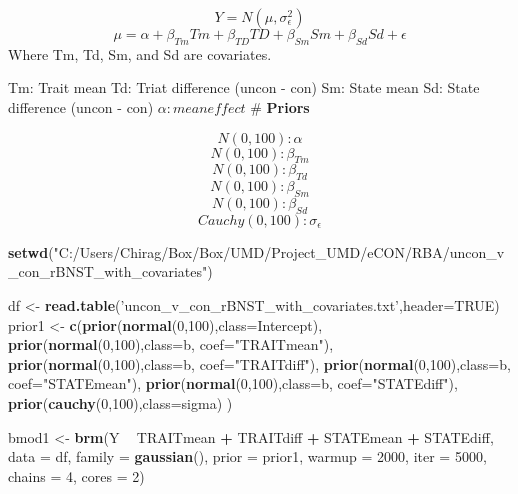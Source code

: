 \documentclass[
]{article}
\newenvironment{Shaded}{\begin{snugshade}}{\end{snugshade}}
\newcommand{\DataTypeTok}[1]{\textcolor[rgb]{0.13,0.29,0.53}{#1}}
\newcommand{\DecValTok}[1]{\textcolor[rgb]{0.00,0.00,0.81}{#1}}
\newcommand{\KeywordTok}[1]{\textcolor[rgb]{0.13,0.29,0.53}{\textbf{#1}}}
\newcommand{\NormalTok}[1]{#1}
\newcommand{\OperatorTok}[1]{\textcolor[rgb]{0.81,0.36,0.00}{\textbf{#1}}}
\newcommand{\OtherTok}[1]{\textcolor[rgb]{0.56,0.35,0.01}{#1}}
\newcommand{\StringTok}[1]{\textcolor[rgb]{0.31,0.60,0.02}{#1}}
\begin{document}
\[Y = N(\mu, \sigma_{\epsilon}^{2})\]
\[\mu = \alpha + \beta_{Tm}Tm + \beta_{TD}TD + \beta_{Sm}Sm+\beta_{Sd}Sd + \epsilon\]
Where Tm, Td, Sm, and Sd are covariates.

Tm: Trait mean Td: Triat difference (uncon - con) Sm: State mean Sd:
State difference (uncon - con) \(\alpha: mean effect\) \#
\textbf{Priors}

\[N(0,100): \alpha\] \[N(0,100): \beta_{Tm}\] \[N(0,100): \beta_{Td}\]
\[N(0,100): \beta_{Sm}\] \[N(0,100): \beta_{Sd}\]
\[Cauchy(0,100): \sigma_{\epsilon}\]

\begin{Shaded}
\begin{Highlighting}[]
\KeywordTok{setwd}\NormalTok{(}\StringTok{"C:/Users/Chirag/Box/Box/UMD/Project_UMD/eCON/RBA/uncon_v_con_rBNST_with_covariates"}\NormalTok{)}

\NormalTok{df <-}\StringTok{ }\KeywordTok{read.table}\NormalTok{(}\StringTok{'uncon_v_con_rBNST_with_covariates.txt'}\NormalTok{,}\DataTypeTok{header=}\OtherTok{TRUE}\NormalTok{)}
\NormalTok{prior1 <-}\StringTok{ }\KeywordTok{c}\NormalTok{(}\KeywordTok{prior}\NormalTok{(}\KeywordTok{normal}\NormalTok{(}\DecValTok{0}\NormalTok{,}\DecValTok{100}\NormalTok{),}\DataTypeTok{class=}\NormalTok{Intercept),}
            \KeywordTok{prior}\NormalTok{(}\KeywordTok{normal}\NormalTok{(}\DecValTok{0}\NormalTok{,}\DecValTok{100}\NormalTok{),}\DataTypeTok{class=}\NormalTok{b, }\DataTypeTok{coef=}\StringTok{"TRAITmean"}\NormalTok{),}
            \KeywordTok{prior}\NormalTok{(}\KeywordTok{normal}\NormalTok{(}\DecValTok{0}\NormalTok{,}\DecValTok{100}\NormalTok{),}\DataTypeTok{class=}\NormalTok{b, }\DataTypeTok{coef=}\StringTok{"TRAITdiff"}\NormalTok{),}
            \KeywordTok{prior}\NormalTok{(}\KeywordTok{normal}\NormalTok{(}\DecValTok{0}\NormalTok{,}\DecValTok{100}\NormalTok{),}\DataTypeTok{class=}\NormalTok{b, }\DataTypeTok{coef=}\StringTok{"STATEmean"}\NormalTok{),}
            \KeywordTok{prior}\NormalTok{(}\KeywordTok{normal}\NormalTok{(}\DecValTok{0}\NormalTok{,}\DecValTok{100}\NormalTok{),}\DataTypeTok{class=}\NormalTok{b, }\DataTypeTok{coef=}\StringTok{"STATEdiff"}\NormalTok{),}
            \KeywordTok{prior}\NormalTok{(}\KeywordTok{cauchy}\NormalTok{(}\DecValTok{0}\NormalTok{,}\DecValTok{100}\NormalTok{),}\DataTypeTok{class=}\NormalTok{sigma)}
\NormalTok{           )}

\NormalTok{bmod1 <-}\StringTok{ }\KeywordTok{brm}\NormalTok{(Y }\OperatorTok{~}\StringTok{ }\NormalTok{TRAITmean }\OperatorTok{+}\StringTok{ }\NormalTok{TRAITdiff }\OperatorTok{+}\StringTok{ }\NormalTok{STATEmean }\OperatorTok{+}\StringTok{ }\NormalTok{STATEdiff, }
             \DataTypeTok{data =}\NormalTok{ df, }
             \DataTypeTok{family =} \KeywordTok{gaussian}\NormalTok{(),}
             \DataTypeTok{prior =}\NormalTok{ prior1, }
             \DataTypeTok{warmup =} \DecValTok{2000}\NormalTok{, }\DataTypeTok{iter =} \DecValTok{5000}\NormalTok{,}
             \DataTypeTok{chains =} \DecValTok{4}\NormalTok{,}
             \DataTypeTok{cores  =} \DecValTok{2}\NormalTok{)}
\end{Highlighting}
\end{Shaded}
\end{document}

